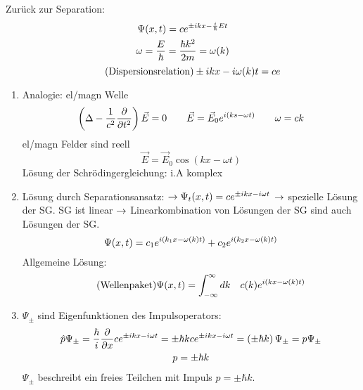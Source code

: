 Zurück zur Separation:
\begin{gather*}
    \Psi(x,t) = c e^{\pm ikx - \frac{i}{\hbar} Et}\\
    \omega = \frac{E}{\hbar} = \frac{\hbar k^2}{2m} = \omega(k)
\end{gather*}
\begin{equation*}
    \tag*{\text{(Dispersionsrelation)}}
    \pm ikx - i\omega(k)t = ce
\end{equation*}
\begin{enumerate}
    \item Analogie: el/magn Welle
    \begin{equation*}
        \left( \Delta - \frac{1}{c^2}\frac{\partial}{\partial t^2} \right) \vec{E} = 0
        \qquad
        \vec{E} = \vec{E}_0 e^{i \left( ks - \omega t \right) }
        \qquad
        \omega = ck
    \end{equation*}
    el/magn Felder sind reell
    \begin{equation*}
        \vec{E} = \vec{E}_0 \cos(kx - \omega t)
    \end{equation*}
    Lösung der Schrödingergleichung: i.A komplex
    \item Lösung durch Separationsansatz: $\rightarrow \Psi_t (x,t) = c e^{\pm ikx - i
    \omega t}$ $\rightarrow$ spezielle Lösung der SG. SG ist linear $\rightarrow$
    Linearkombination von Lösungen der SG sind auch Lösungen der SG.
    \begin{equation*}
        \Psi(x,t) = c_1 e^{i \left( k_1 x - \omega(k) t \right) }
        + c_2 e^{i \left( k_2 x - \omega(k) t \right) }
    \end{equation*}
    Allgemeine Lösung:
    \begin{equation*}
        \tag*{\text{(Wellenpaket)}}
        \Psi(x,t) = 
        \infint dk \quad c(k) e^{i \lk kx - \omega(k) t \rk }
    \end{equation*}
    \item $\Psi_{\pm}$ sind Eigenfunktionen des Impulsoperators:
    \begin{gather*}
        \hat{p}\Psi_{\pm} 
        =
        \frac{\hbar}{i} \frac{\partial}{\partial x} c e^{\pm ikx - i\omega t}
        =
        \pm \hbar k c e^{\pm ikx - i\omega t}
        =
        \left( \pm \hbar k \right) \Psi_{\pm}
        =
        p \Psi_{\pm} \\
        p = \pm \hbar k
    \end{gather*}
    $\Psi_{\pm}$ beschreibt ein freies Teilchen mit Impuls $p = \pm \hbar k$.


\end{enumerate}
